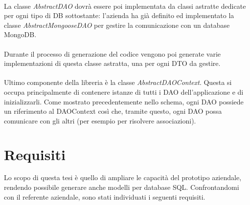 \documentclass[a4paper, 12pt]{report}
\begin{document}
      \paragraph*{}
      La classe \emph{AbstractDAO} dovrà essere poi implementata da classi astratte dedicate per ogni tipo di DB sottostante: l'azienda ha già definito ed implementato la classe \emph{AbstractMongooseDAO} per gestire la comunicazione con un database MongoDB.
      \paragraph*{}
      Durante il processo di generazione del codice vengono poi generate varie implementazioni di questa classe astratta, una per ogni DTO da gestire.
      \paragraph*{}
      Ultimo componente della libreria è la classe \emph{AbstractDAOContext}. Questa si occupa principalmente di contenere istanze di tutti i DAO dell'applicazione e di inizializzarli.
      Come mostrato precedentemente nello schema, ogni DAO possiede un riferimento al DAOContext così che, tramite questo, ogni DAO possa comunicare con gli altri (per esempio per risolvere associazioni).
    \section{Requisiti}
      Lo scopo di questa tesi è quello di ampliare le capacità del prototipo aziendale, rendendo possibile generare anche modelli per database SQL.
      Confrontandomi con il referente aziendale, sono stati individuati i seguenti requisiti.
\end{document}

